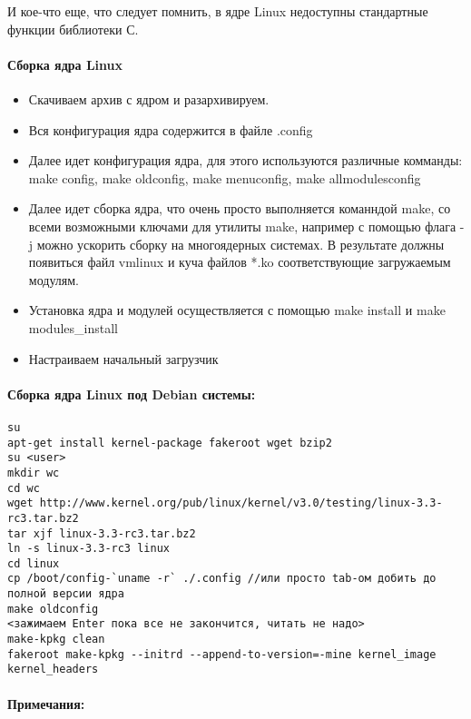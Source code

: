 И кое-что еще, что следует помнить, в ядре Linux недоступны стандартные функции библиотеки С.

\paragraph{Сборка ядра Linux}

\begin{itemize}
\item Скачиваем архив с ядром и разархивируем.

\item Вся конфигурация ядра содержится в файле .config

\item Далее идет конфигурация ядра, для этого используются различные комманды: make config, make oldconfig, make menuconfig,
make allmodulesconfig

\item Далее идет сборка ядра, что очень просто выполняется команндой make, со всеми возможными ключами для утилиты make, например с
помощью флага -j можно ускорить сборку на многоядерных системах. В результате должны появиться файл vmlinux и куча файлов *.ko
соответствующие загружаемым модулям.

\item Установка ядра и модулей осуществляется с помощью make install и make modules\_install

\item Настраиваем начальный загрузчик
\end{itemize}

\paragraph{Сборка ядра Linux под Debian системы:}

\begin{lstlisting}
su
apt-get install kernel-package fakeroot wget bzip2
su <user>
mkdir wc
cd wc
wget http://www.kernel.org/pub/linux/kernel/v3.0/testing/linux-3.3-rc3.tar.bz2
tar xjf linux-3.3-rc3.tar.bz2
ln -s linux-3.3-rc3 linux
cd linux
cp /boot/config-`uname -r` ./.config //или просто tab-ом добить до полной версии ядра
make oldconfig
<зажимаем Enter пока все не закончится, читать не надо>
make-kpkg clean
fakeroot make-kpkg --initrd --append-to-version=-mine kernel_image kernel_headers
\end{lstlisting}

\paragraph{Примечания:}

